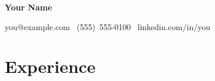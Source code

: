 \documentclass[11pt]{article}
\begin{document}
{\LARGE\bfseries Your Name}\par
\mbox{you@example.com} \textbar\ \mbox{(555) 555-0100} \textbar\ \mbox{linkedin.com/in/you}

\section*{Experience}
\end{document}
